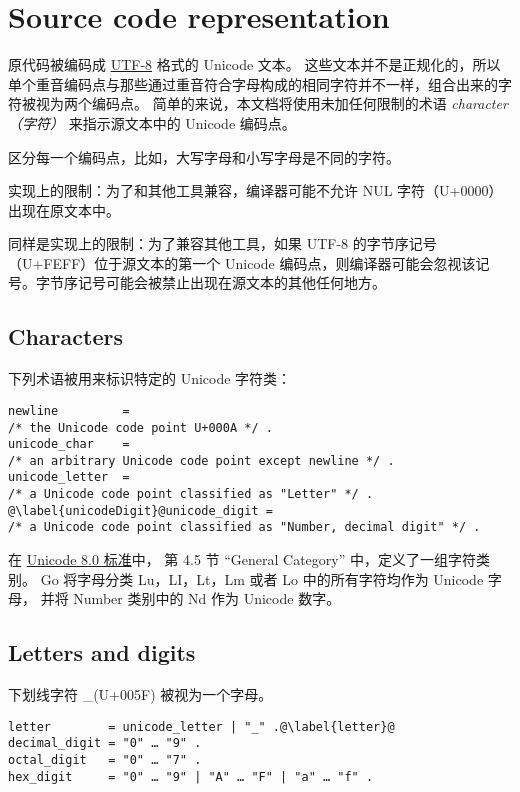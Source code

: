 
\chapter{Source code representation}
原代码被编码成 \href{http://en.wikipedia.org/wiki/UTF-8}{UTF-8} 格式的 Unicode 文本。
这些文本并不是正规化的，所以单个重音编码点与那些通过重音符合字母构成的相同字符并不一样，组合出来的字符被视为两个编码点。
简单的来说，本文档将使用未加任何限制的术语 \emph{character（字符）} 来指示源文本中的 Unicode 编码点。

区分每一个编码点，比如，大写字母和小写字母是不同的字符。

实现上的限制：为了和其他工具兼容，编译器可能不允许 NUL 字符（U+0000）出现在原文本中。

同样是实现上的限制：为了兼容其他工具，如果 UTF-8 的字节序记号（U+FEFF）位于源文本的第一个 Unicode 编码点，则编译器可能会忽视该记号。字节序记号可能会被禁止出现在源文本的其他任何地方。

\section{Characters}
下列术语被用来标识特定的 Unicode 字符类：
\begin{lstlisting}[style=EBNF]
newline			= 
/* the Unicode code point U+000A */ .
unicode_char	=
/* an arbitrary Unicode code point except newline */ .
unicode_letter	= 
/* a Unicode code point classified as "Letter" */ .
@\label{unicodeDigit}@unicode_digit	= 
/* a Unicode code point classified as "Number, decimal digit" */ .
\end{lstlisting}
在 \href{http://www.unicode.org/versions/Unicode8.0.0/}{Unicode 8.0 标准}中，
第 4.5 节 ``General Category'' 中，定义了一组字符类别。
Go 将字母分类 Lu，LI，Lt，Lm 或者 Lo 中的所有字符均作为 Unicode 字母，
并将 Number 类别中的 Nd 作为 Unicode 数字。

\section{Letters and digits}
下划线字符 \_(U+005F) 被视为一个字母。
\begin{lstlisting}[style=EBNF]
letter        = unicode_letter | "_" .@\label{letter}@
decimal_digit = "0" … "9" .
octal_digit   = "0" … "7" .
hex_digit     = "0" … "9" | "A" … "F" | "a" … "f" .
\end{lstlisting}



